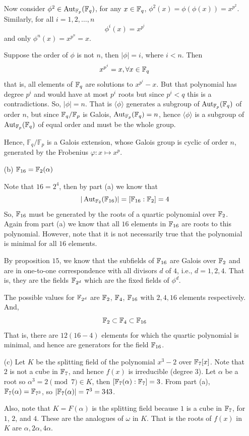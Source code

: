 \documentclass[12pt]{article}
\begin{document}
\begin{solution}
\begin{enumerate}
        Now consider $\phi^2 \in \Aut_{\F_p}(\F_q)$, for any $x \in \F_q$, $\phi^2(x) = \phi(\phi(x)) = x^{p^2}$. Similarly, for all $i = 1, 2, \ldots, n$
        \[\phi^i(x) = x^{p^i}\]
        and only $\phi^n(x) = x^{p^n} = x$. 
        
        Suppose the order of $\phi$ is not $n$, then $|\phi| = i$, where $i < n$. Then \[x^{p^i} = x, \forall x \in \F_q\]
        that is, all elements of $\F_q$ are solutions to $x^{p^i} -x$. But that polynomial has degree $p^i$ and would have at most $p^i$ roots but since $p^i < q$ this is a contradictions. So, $|\phi| = n$. That is $\langle \phi \rangle$ generates a subgroup of $\Aut_{\F_p}(\F_q)$ of order $n$, but since $\F_q/\F_p$ is Galois, $\Aut_{\F_p}(\F_q) = n$, hence $\langle \phi \rangle$ is a subgroup of $\Aut_{\F_p}(\F_q)$ of equal order and must be the whole group. 

        Hence, $\mathbb{F}_q/\mathbb{F}_p$ is a Galois extension,    whose Galois group is cyclic of order $n$, generated by the Frobenius $\varphi:x\mapsto x^p$.

        \item[(b)] $\mathbb F_{16} = \mathbb F_2(\alpha)$
        
        Note that $16 = 2^4$, then by part (a) we know that 
        \[|\operatorname{Aut}_{\mathbb F_2}(\mathbb F_{16})| = [\mathbb F_{16} : \mathbb F_{2}] = 4\]
        So, $\mathbb F_{16}$ must be generated by the roots of a quartic polynomial over $\mathbb F_2$. Again from part (a) we know that all $16$ elements in $\mathbb F_{16}$ are roots to this polynomial. However, note that it is not necessarily true that the polynomial is minimal for all $16$ elements. 
        
        By proposition $15$, we know that the subfields of $\mathbb F_{16}$ are Galois over $\mathbb F_2$ and are in one-to-one correspondence with all divisors $d$ of $4$, i.e., $d = 1, 2, 4$. That is, they are the  fields $\mathbb F_{2^d}$ which are the fixed fields of $\phi^d$. 

        The possible values for $\mathbb F_{2^d}$ are $\mathbb F_2$, $\mathbb F_4$, $\mathbb F_{16}$ with $2, 4, 16$ elements respectively. And, 
        \[\mathbb F_2 \subset \mathbb F_4 \subset \mathbb F_{16}\]
        That is, there are $12 (16-4)$ elements for which the quartic polynomial is minimal, and hence are generators for the field $\mathbb F_{16}$.

        \item[(c)]  Let $K$ be the splitting field of the polynomial $x^3 -2$ over $\mathbb F_7[x]$. Note that $2$ is not a cube in $\mathbb F_7$, and hence $f(x)$ is irreducible (degree $3$). Let $\alpha$ be a root so $\alpha^3 = 2  \pmod 7 \in K$, then $[\mathbb F_7(\alpha):\mathbb F_7] = 3$. From part (a), $\mathbb F_7(\alpha) = \mathbb F_{7^3}$, so $|\mathbb F_7(\alpha)| = 7^3 = 343$. 
        
       Also, note that $K = F(\alpha)$ is the splitting field because $1$ is a cube in $\mathbb F_7$, for $1$, $2$, and $4$. These are the analogues of $\omega$ in $K$. That is the roots of $f(x)$ in $K$ are $\alpha, 2\alpha, 4\alpha$. 
    \end{enumerate}
\end{solution}
\end{document}
